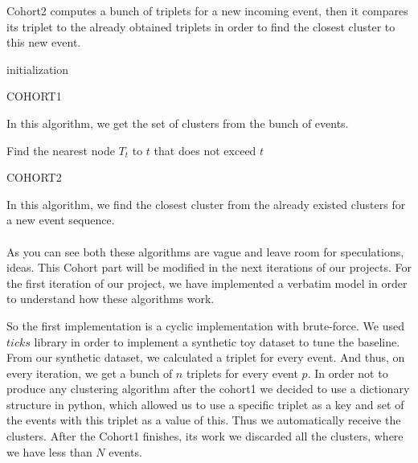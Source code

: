 \documentclass[10pt]{article}
\begin{document}
Cohort2 computes a bunch of triplets for a new incoming event, then it compares its triplet to the already obtained triplets in order to find the closest cluster to this new event.




\begin{algorithm}
 initialization\;

\caption{COHORT1}
\end{algorithm}
 
In this algorithm, we get the set of clusters from the bunch of events.

\begin{algorithm}[H]
 Find the nearest node $T_t$ to $t$ that does not exceed $t$ \;
\caption{COHORT2}
\end{algorithm}
In this algorithm, we find the closest cluster from the already existed clusters for a new event sequence.

\paragraph{}
As you can see both these algorithms are vague and leave room for speculations, ideas. This Cohort part will be modified in the next iterations of our projects. For the first iteration of our project, we have implemented a verbatim model in order to understand how these algorithms work. 

So the first implementation is a cyclic implementation with brute-force. We used $ticks$ library in order to implement a synthetic toy dataset to tune the baseline. From our synthetic dataset, we calculated a triplet for every event. And thus, on every iteration, we get a bunch of $n$ triplets for every event $p$. In order not to produce any clustering algorithm after the cohort1 we decided to use a dictionary structure in python, which allowed us to use a specific triplet as a key and set of the events with this triplet as a value of this. Thus we automatically receive the clusters. After the Cohort1 finishes, its work we discarded all the clusters, where we have less than $N$ events.
\end{document}
